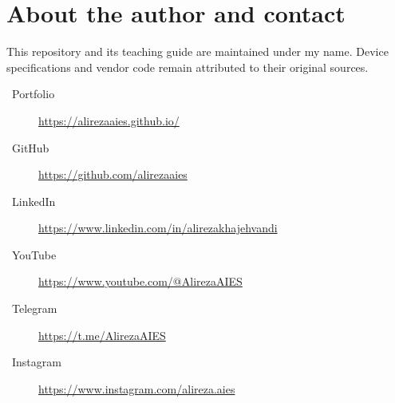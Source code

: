 \section*{About the author and contact}
\authorname

This repository and its teaching guide are maintained under my name. Device specifications and vendor code remain attributed to their original sources.
\begin{description}
\item[\faGlobe\ Portfolio] \url{https://alirezaaies.github.io/}
\item[\faGithub\ GitHub] \url{https://github.com/alirezaaies}
\item[\faLinkedin\ LinkedIn] \url{https://www.linkedin.com/in/alirezakhajehvandi}
\item[\faYoutube\ YouTube] \url{https://www.youtube.com/@AlirezaAIES}
\item[\faTelegram\ Telegram] \url{https://t.me/AlirezaAIES}
\item[\faInstagram\ Instagram] \url{https://www.instagram.com/alireza.aies}
\end{description}
